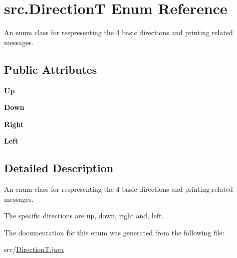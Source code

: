 \hypertarget{enumsrc_1_1DirectionT}{}\section{src.\+DirectionT Enum Reference}
\label{enumsrc_1_1DirectionT}


An enum class for respresenting the 4 basic directions and printing related messages.  


\subsection*{Public Attributes}
\begin{DoxyCompactItemize}
\item 
\mbox{\label{enumsrc_1_1DirectionT_a9d58d3354ca79148216a74ab2667d4c1}} 
{\bfseries Up}
\item 
\mbox{\label{enumsrc_1_1DirectionT_a037a85f0b2a5abd3991210c8cbd1461e}} 
{\bfseries Down}
\item 
\mbox{\label{enumsrc_1_1DirectionT_ad6c02ffee364ef4b7449a2ef72fa3d25}} 
{\bfseries Right}
\item 
\mbox{\label{enumsrc_1_1DirectionT_ab9d1e2dfcddbc3764a77ac6435db108a}} 
{\bfseries Left}
\end{DoxyCompactItemize}


\subsection{Detailed Description}
An enum class for respresenting the 4 basic directions and printing related messages. 

The specific directions are up, down, right and, left. 

The documentation for this enum was generated from the following file\+:\begin{DoxyCompactItemize}
\item 
src/\hyperlink{DirectionT_8java}{Direction\+T.\+java}\end{DoxyCompactItemize}
